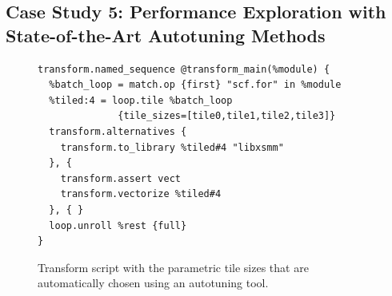 \documentclass[screen,nonacm,authorversion]{acmart}
\newcommand{\TODO}[1]{{\color{red}\textbf{TODO:} #1}}
\begin{document}

\subsection{Case Study 5: Performance Exploration with State-of-the-Art Autotuning Methods}

\begin{figure}[t]
\centering
\begin{lstlisting}[style=transform]
transform.named_sequence @transform_main(%module) {
  %batch_loop = match.op {first} "scf.for" in %module
  %tiled:4 = loop.tile %batch_loop
              {tile_sizes=[tile0,tile1,tile2,tile3]} 
  transform.alternatives {
    transform.to_library %tiled#4 "libxsmm"
  }, { 
    transform.assert vect
    transform.vectorize %tiled#4
  }, { }
  loop.unroll %rest {full}
}
\end{lstlisting}
\caption{Transform script with the parametric tile sizes that are automatically chosen using an autotuning tool.}
\label{lst:parametric_batchmatmul_transform_script}
\end{figure}
\end{document}
